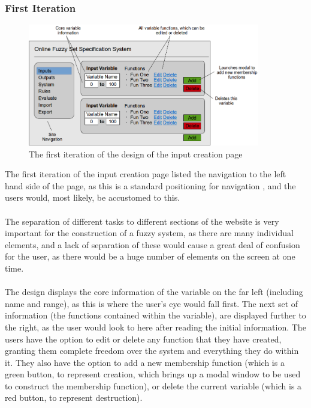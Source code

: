 \subsubsection{First Iteration}
\begin{figure}[ht!]
\begin{center}
\includegraphics[width=0.9\textwidth]{images/firstItInputs}
\end{center}
\vspace{-2mm}
\caption{The first iteration of the design of the input creation page}
\label{fig:design-firstIterationInputs}
\vspace{-1mm}
\end{figure}
\noindent 
The first iteration of the input creation page listed the navigation to the left hand side of the page, as this is a standard positioning for navigation \cite{mccarthy2004could}, and the users would, most likely, be accustomed to this. \ \\
\ \\
The separation of different tasks to different sections of the website is very important for the construction of a fuzzy system, as there are many individual elements, and a lack of separation of these would cause a great deal of confusion for the user, as there would be a huge number of elements on the screen at one time.\ \\
\ \\
The design displays the core information of the variable on the far left (including name and range), as this is where the user's eye would fall first. The next set of information (the functions contained within the variable), are displayed further to the right, as the user would look to here after reading the initial information. The users have the option to edit or delete any function that they have created, granting them complete freedom over the system and everything they do within it. They also have the option to add a new membership function (which is a green button, to represent creation, which brings up a modal window to be used to construct the membership function), or delete the current variable (which is a red button, to represent destruction). \ \\

